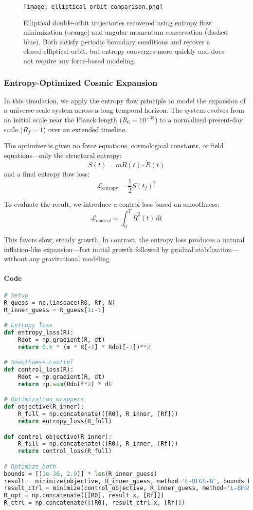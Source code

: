 \documentclass[12pt]{article}
\begin{document}
\begin{figure}[H]
\centering
\texttt{[image: elliptical\_orbit\_comparison.png]}
\caption{
Elliptical double-orbit trajectories recovered using entropy flow minimization (orange) and angular momentum conservation (dashed blue). Both satisfy periodic boundary conditions and recover a closed elliptical orbit, but entropy converges more quickly and does not require any force-based modeling.
}
\end{figure}


\subsubsection{Entropy-Optimized Cosmic Expansion}

In this simulation, we apply the entropy flow principle to model the expansion of a universe-scale system across a long temporal horizon. The system evolves from an initial scale near the Planck length (\( R_0 = 10^{-35} \)) to a normalized present-day scale (\( R_f = 1 \)) over an extended timeline.

The optimizer is given no force equations, cosmological constants, or field equations—only the structural entropy:
\[
S(t) = m R(t) \cdot \dot{R}(t)
\]
and a final entropy flow loss:
\[
\mathcal{L}_{\text{entropy}} = \frac{1}{2} S(t_f)^2
\]

To evaluate the result, we introduce a control loss based on smoothness:
\[
\mathcal{L}_{\text{control}} = \int_0^T \dot{R}^2(t) \, dt
\]

This favors slow, steady growth. In contrast, the entropy loss produces a natural inflation-like expansion—fast initial growth followed by gradual stabilization—without any gravitational modeling.

\paragraph*{Code}\mbox{}
\begin{lstlisting}[language=Python]
# Setup
R_guess = np.linspace(R0, Rf, N)
R_inner_guess = R_guess[1:-1]

# Entropy loss
def entropy_loss(R):
    Rdot = np.gradient(R, dt)
    return 0.5 * (m * R[-1] * Rdot[-1])**2

# Smoothness control
def control_loss(R):
    Rdot = np.gradient(R, dt)
    return np.sum(Rdot**2) * dt

# Optimization wrappers
def objective(R_inner):
    R_full = np.concatenate(([R0], R_inner, [Rf]))
    return entropy_loss(R_full)

def control_objective(R_inner):
    R_full = np.concatenate(([R0], R_inner, [Rf]))
    return control_loss(R_full)

# Optimize both
bounds = [(1e-36, 2.0)] * len(R_inner_guess)
result = minimize(objective, R_inner_guess, method='L-BFGS-B', bounds=bounds)
result_ctrl = minimize(control_objective, R_inner_guess, method='L-BFGS-B', bounds=bounds)
R_opt = np.concatenate([[R0], result.x, [Rf]])
R_ctrl = np.concatenate([[R0], result_ctrl.x, [Rf]])
\end{lstlisting}
\end{document}
